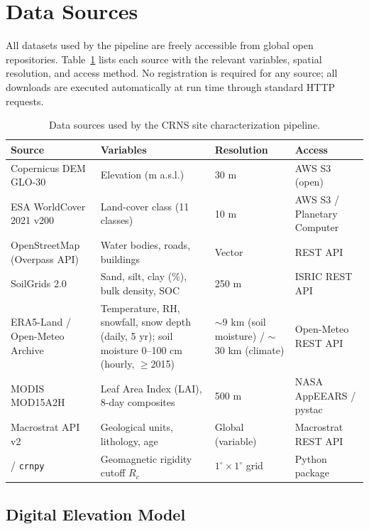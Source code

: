 \section{Data Sources}
\label{sec:data}

All datasets used by the pipeline are freely accessible from global
open repositories.
Table~\ref{tab:datasources} lists each source with the relevant
variables, spatial resolution, and access method.
No registration is required for any source; all downloads are executed
automatically at run time through standard HTTP requests.

\begin{table}[H]
\centering
\caption{Data sources used by the CRNS site characterization pipeline.}
\label{tab:datasources}
\small
\begin{tabularx}{\linewidth}{lXll}
\toprule
Source & Variables & Resolution & Access \\
\midrule
Copernicus DEM GLO-30
  & Elevation (m a.s.l.)
  & 30 m
  & AWS S3 (open) \\
ESA WorldCover 2021 v200
  & Land-cover class (11 classes)
  & 10 m
  & AWS S3 / Planetary Computer \\
OpenStreetMap (Overpass API)
  & Water bodies, roads, buildings
  & Vector
  & REST API \\
SoilGrids 2.0
  & Sand, silt, clay (\%), bulk density, SOC
  & 250 m
  & ISRIC REST API \\
ERA5-Land / Open-Meteo Archive
  & Temperature, RH, snowfall, snow depth (daily, 5 yr);
    soil moisture 0--100 cm (hourly, $\geq$2015)
  & $\sim$9 km (soil moisture) / $\sim$30 km (climate)
  & Open-Meteo REST API \\
MODIS MOD15A2H
  & Leaf Area Index (LAI), 8-day composites
  & 500 m
  & NASA AppEEARS / pystac \\
Macrostrat API v2
  & Geological units, lithology, age
  & Global (variable)
  & Macrostrat REST API \\
\citet{smart2019} / \texttt{crnpy}
  & Geomagnetic rigidity cutoff $R_c$
  & $1^\circ \times 1^\circ$ grid
  & Python package \\
\bottomrule
\end{tabularx}
\end{table}

\subsection{Digital Elevation Model}

